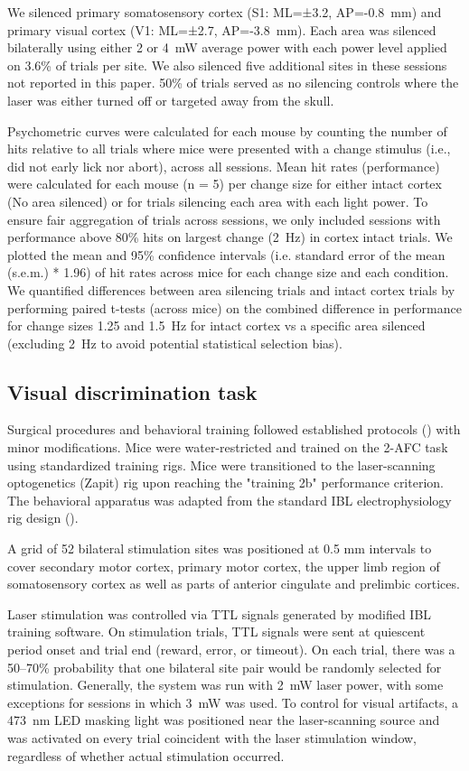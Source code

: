 We silenced primary somatosensory cortex (S1: ML=±3.2, AP=-0.8~mm) and primary visual cortex (V1: ML=±2.7, AP=-3.8~mm).
Each area was silenced bilaterally using either 2 or 4~mW average power with each power level applied on 3.6\% of trials per site.
We also silenced five additional sites in these sessions not reported in this paper. 50\% of trials served as no silencing controls where the laser was either turned off or targeted away from the skull.

Psychometric curves were calculated for each mouse by counting the number of hits relative to all trials where mice were presented with a change stimulus (i.e., did not early lick nor abort), across all sessions.
Mean hit rates (performance) were calculated for each mouse (n = 5) per change size for either intact cortex (No area silenced) or for trials silencing each area with each light power.
To ensure fair aggregation of trials across sessions, we only included sessions with performance above 80\% hits on largest change (2~Hz) in cortex intact trials.
We plotted the mean and  95\% confidence intervals (i.e. standard error of the mean (s.e.m.) * 1.96) of hit rates across mice for each change size and each condition.
We quantified differences between area silencing trials and intact cortex trials by performing paired t-tests (across mice) on the combined difference in performance for change sizes 1.25 and 1.5~Hz for intact cortex vs a specific area silenced (excluding 2~Hz to avoid potential statistical selection bias).


\subsection{Visual discrimination task}

Surgical procedures and behavioral training followed established protocols (\cite{InternationalBrainLaboratory2021StandardizedMice,InternationalBrainLaboratory2025ABehaviour}) with minor modifications.
Mice were water-restricted and trained on the 2-AFC task using standardized training rigs.
Mice were transitioned to the laser-scanning optogenetics (Zapit) rig upon reaching the "training 2b" performance criterion.
The behavioral apparatus was adapted from the standard IBL electrophysiology rig design (\cite{InternationalBrainLaboratory2021StandardizedMice}).

A grid of 52 bilateral stimulation sites was positioned at 0.5 mm intervals to cover secondary motor cortex, primary motor cortex, the upper limb region of somatosensory cortex as well as parts of anterior cingulate and prelimbic cortices.

Laser stimulation was controlled via TTL signals generated by modified IBL training software.
On stimulation trials, TTL signals were sent at quiescent period onset and trial end (reward, error, or timeout).
On each trial, there was a 50–70\% probability that one bilateral site pair would be randomly selected for stimulation.
Generally, the system was run with 2~mW laser power, with some exceptions for sessions in which 3~mW was used.
To control for visual artifacts, a 473~nm LED masking light was positioned near the laser-scanning source and was activated on every trial coincident with the laser stimulation window, regardless of whether actual stimulation occurred.
